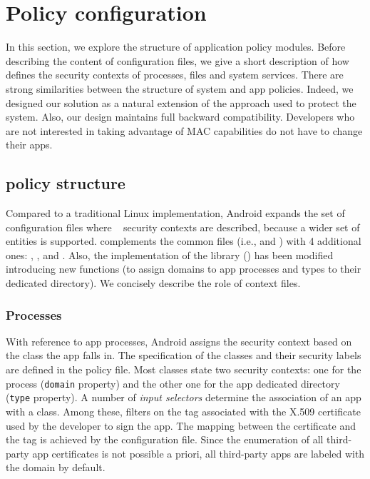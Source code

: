 \section{Policy configuration}\label{sect:seapp_config}

In this section, we explore the structure of application policy
modules.  Before describing the content of \pap configuration files,
we give a short description of how \sea defines the security contexts
of processes, files and system services.  There are strong
similarities between the structure of system and app policies.
Indeed, we designed our solution as a natural extension of the
approach used to protect the system.  Also, our design maintains full
backward compatibility.  Developers who are not interested in taking
advantage of MAC capabilities do not have to change their apps.


\subsection{\sea policy structure}\label{sect:seapp_seandroid}

Compared to a traditional Linux implementation, Android expands the
set of configuration files where \sel~\cite{seapp_sea_files} security
contexts are described, because a wider set of entities is supported.
\sea complements the common \sel files (i.e., \filecontexts and
\genfscontexts) with 4 additional ones: \propertycontexts,
\servicecontexts, \seappcontexts and \macpermissions.  Also, the
implementation of the \sel library (\libselinux)
\cite{seapp_libselinux} has been modified introducing new functions
(to assign domains to app processes and types to their dedicated
directory).  We concisely describe the role of \sea context files.

\subsubsection{Processes}

With reference to app processes, Android assigns the security context
based on the class the app falls in.  The specification of the classes
and their security labels are defined in the \seappcontexts policy
file.  Most classes state two security contexts: one for the process
({\tt domain} property) and the other one for the app dedicated
directory ({\tt type} property).  A number of {\em input selectors}
determine the association of an app with a class.  Among these,
\seinfo filters on the tag associated with the X.509 certificate used
by the developer to sign the app.  The mapping between the certificate
and the \seinfo tag is achieved by the \macpermissions configuration
file.  Since the enumeration of all third-party app certificates is
not possible a priori, all third-party apps are labeled with the
\untrustedapp domain by default.


